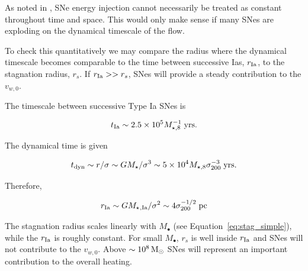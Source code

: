 \documentclass[usenatbib,fleqn]{mn2e}
\newcommand\gsim{\mathrel{\rlap{\lower4pt\hbox{\hskip1pt$\sim$}}
    \raise1pt\hbox{$>$}}}
\newcommand{\rs}{r_s}
\newcommand{\Mstar}{M_{\star}}
\newcommand{\Mseight}{M_{\star,8}}
\newcommand{\Mbh}[1][]{M_{\bullet#1}}
\newcommand{\rIa}{r_{\rm Ia}}
\newcommand{\vwO}{v_{w,0}}
\begin{document}
\begin{enumerate}

  As noted in \citealt{ShcherbakovWong+:2014a}, SNe energy injection
  cannot necessarily be treated as constant throughout time and
  space. This would only make sense if many SNes are exploding on the
  dynamical timescale of the flow.

  To check this quantitatively we may compare the radius where the
  dynamical timescale becomes comparable to the time between successive
  Ias, $\rIa$, to the stagnation radius, $\rs$. If $\rIa>>\rs$, SNes
  will provide a steady contribution to the $\vwO$. 

  The timescale between successive Type Ia SNes is

  \begin{align}
    t_{\rm Ia} \sim 2.5 \times 10^5 \Mseight^{-1} \; {\rm yrs}.
  \end{align}

  The dynamical time is given

  \begin{align}
    t_{\rm dyn} \sim r/\sigma \sim G \Mstar/\sigma^3 \sim 5 \times 10^4
    \Mseight \sigma_{200}^{-3} \; {\rm yrs}.
  \end{align}

  Therefore,

  \begin{align}
    r_{\rm Ia} \sim G \Mstar{}_{,\rm Ia}/\sigma^2 \sim 4
    \sigma_{200}^{-1/2} \; {\rm pc}
  \end{align}

  The stagnation radius scales linearly with $\Mbh$ (see
  Equation~\ref{eq:stag_simple}), while the $\rIa$ is roughly
  constant. For small $\Mbh$, $\rs$ is well inside $\rIa$ and SNes will
  not contribute to the $\vwO$.  Above $\sim10^8 \,{\rm M_\odot}$ SNes will
  represent an important contribution to the overall heating.


\end{enumerate}
\end{document}
